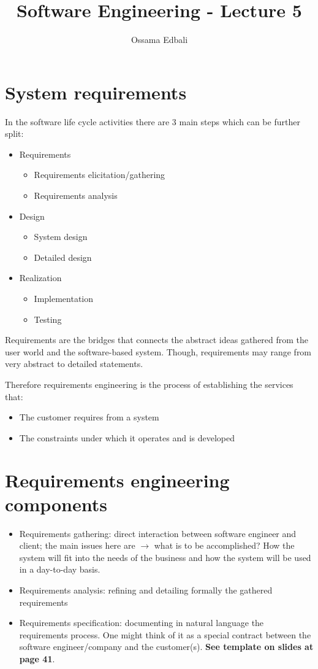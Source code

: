 \documentclass{article}
\title{Software Engineering - Lecture 5}
\author{Ossama Edbali}
\begin{document}
	\maketitle
	
	\section{System requirements}
	In the software life cycle activities there are 3 main steps which can be further split:
	\begin{itemize}
		\item Requirements
		\begin{itemize}
			\item Requirements elicitation/gathering
			\item Requirements analysis
		\end{itemize}
		\item Design
		\begin{itemize}
			\item System design
			\item Detailed design
		\end{itemize}
		\item Realization
		\begin{itemize}
			\item Implementation
			\item Testing
		\end{itemize}
	\end{itemize}
	
	Requirements are the bridges that connects the abstract ideas gathered from the user world and the
	software-based system. Though, requirements may range from very abstract to detailed statements.
	
	Therefore requirements engineering is the process of establishing the services that:
	\begin{itemize}
		\item The customer requires from a system
		\item The constraints under which it operates and is developed
	\end{itemize}
	
	\section{Requirements engineering components}	
	\begin{itemize}
		\item Requirements gathering: direct interaction between software engineer and client; the main
		issues here are $\rightarrow$ what is to be accomplished? How the system will fit into the needs
		of the business and how the system will be used in a day-to-day basis.
		\item Requirements analysis: refining and detailing formally the gathered requirements
		\item Requirements specification: documenting in natural language the requirements process.
		One might think of it as a special contract between the software engineer/company and the
		customer(s). \textbf{See template on slides at page 41}.
	\end{itemize}		
	
\end{document}
